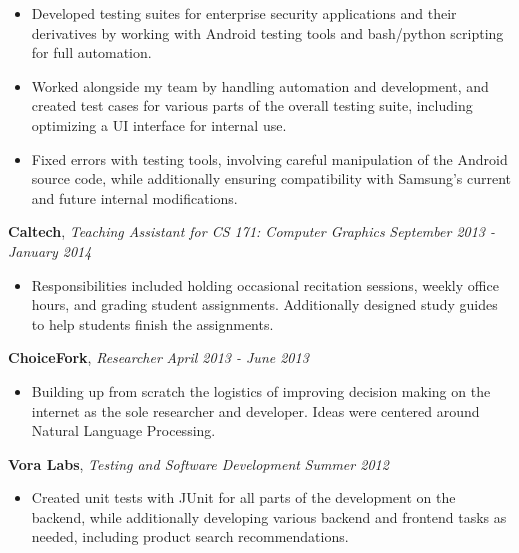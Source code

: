 \documentclass[9pt]{article}
\newenvironment{changemargin}[2]{%
  \begin{list}{}{%
    \setlength{\topsep}{0pt}%
    \setlength{\leftmargin}{#1}%
    \setlength{\rightmargin}{#2}%
    \setlength{\listparindent}{\parindent}%
    \setlength{\itemindent}{\parindent}%
    \setlength{\parsep}{\parskip}%
  }%
  \item[]}{\end{list}
}
\newenvironment{body} {
	\vspace*{-16pt}
	\begin{changemargin}{-0.25in}{-0.5in}
  }	
	{\end{changemargin}
}
\begin{document}
\begin{body}
\begin{itemize}
	\item Developed testing suites for enterprise security applications and their derivatives by working with Android testing tools and bash/python scripting for full automation.
	\item Worked alongside my team by handling automation and development, and created test cases for various parts of the overall testing suite, including optimizing a UI interface for internal use.
	\item Fixed errors with testing tools, involving careful manipulation of the Android source code, while additionally ensuring compatibility with Samsung's current and future internal modifications.
	\end{itemize}
	\vspace*{1pt}
	\textbf{Caltech}, \emph{Teaching Assistant for CS 171: Computer Graphics} \hfill \emph{September 2013 - January 2014}\\
	\vspace*{-3pt}
	\begin{itemize} \itemsep -0pt %
	\item Responsibilities included holding occasional recitation sessions, weekly office hours, and grading student assignments. Additionally designed study guides to help students finish the assignments.
	\end{itemize}
	\vspace*{1pt}
	\newpage
	\textbf{ChoiceFork}, \emph{Researcher} \hfill \emph{April 2013 - June 2013}\\
	\vspace*{-3pt}
	\begin{itemize} \itemsep -0pt  %
		\item Building up from scratch the logistics of improving decision making on the internet as the sole researcher and developer. Ideas were centered around Natural Language Processing.
	\end{itemize}
\smallskip
	\vspace*{1pt}
	\textbf{Vora Labs}, \emph{Testing and Software Development} \hfill \emph{Summer 2012}\\
	\vspace*{-3pt}
	\begin{itemize} \itemsep -0pt  %
		\item Created unit tests with JUnit for all parts of the development on the backend, while additionally developing various backend and frontend tasks as needed, including product search recommendations.
	\end{itemize}
	\vspace*{-3pt}
\smallskip

	
\end{body}
\end{document}
